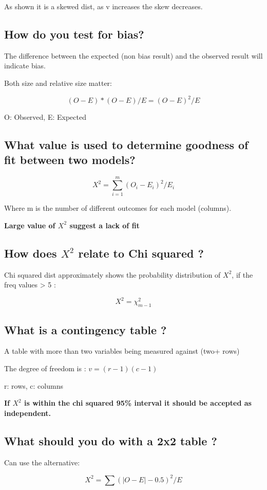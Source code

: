 \documentclass[11pt]{scrartcl} %
\begin{document}
As shown it is a skewed dist, as v increases the skew decreases.

\subsection{How do you test for
bias?}

The difference between the expected (non bias result) and the observed
result will indicate bias.

Both size and relative size matter:

\begin{equation}
	(O-E) * (O-E)/E = (O-E)^2/E
\end{equation}

O: Observed, E: Expected

\subsection{What value is used to determine goodness of fit between
two
models?}

\begin{equation}
	X^2 = \sum^{m}_{i=1} (O_i - E_i)^2/E_i
\end{equation}

Where m is the number of different outcomes for each model (columns).

\textbf{Large value of \(X^2\) suggest a lack of fit}

\subsection{\texorpdfstring{How does \(X^2\) relate to Chi squared
?}{How does X\^{}2 relate to Chi squared ?}}

Chi squared dist approximately shows the probability distribution of
\(X^2\), if the freq values \textgreater{} 5 :

\begin{equation}
	X^2 = \chi^2_{m-1}
\end{equation}

\subsection{What is a contingency table
?}

A table with more than two variables being measured against (two+ rows)

The degree of freedom is : \(v= (r-1)(c-1)\)

r: rows, c: columns

\textbf{If \(X^2\) is within the chi squared 95\% interval it should be
accepted as independent.}

\subsection{What should you do with a 2x2 table
?}

Can use the alternative:

\begin{equation}
	X^2 = \sum (|O-E|-0.5)^2/E
\end{equation}
\end{document}
